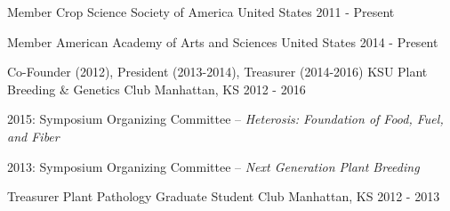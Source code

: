 
\begin{cventries}

  \cventry
    {Member} %
    {Crop Science Society of America} %
    {United States} %
    {2011 - Present} %
    {}
      
  \cventry
    {Member} %
    {American Academy of Arts and Sciences} %
    {United States} %
    {2014 - Present} %
    {}
      
  \cventry
    {Co-Founder (2012), President (2013-2014), Treasurer (2014-2016)} %
    {KSU Plant Breeding \& Genetics Club} %
    {Manhattan, KS} %
    {2012 - 2016} %
    {
      \begin{cvitems} %
        \item {2015: Symposium Organizing Committee – \textit{Heterosis: Foundation of Food, Fuel, and Fiber}}
        \item {2013: Symposium Organizing Committee – \textit{Next Generation Plant Breeding}}
      \end{cvitems}
    }
    
  \cventry
    {Treasurer} %
    {Plant Pathology Graduate Student Club } %
    {Manhattan, KS} %
    {2012 - 2013} %
    {}
\end{cventries}